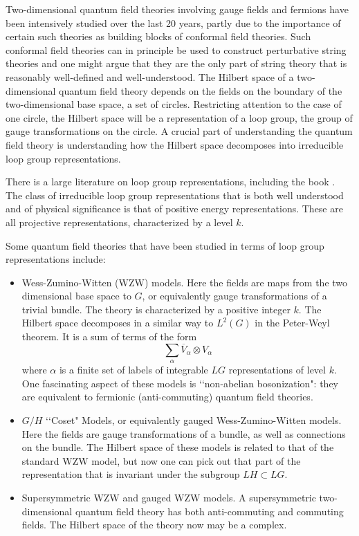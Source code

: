 \documentclass[a4paper,a4paper]{article}
\theoremstyle{conjecture}
\begin{document}
Two-dimensional quantum field theories involving gauge fields and fermions
 have been intensively studied over the last 20 years, partly due
to the importance of certain such theories as building blocks of conformal field theories.  Such
conformal field theories can in principle be used to construct perturbative string theories and one
might argue that they are the only part of string theory that is reasonably well-defined and
well-understood.  The Hilbert space of a two-dimensional quantum field theory depends on the
fields on the boundary of the two-dimensional base space, a set of circles.  Restricting
attention to the case of one circle, the Hilbert space will be a representation of a loop group, the
group of gauge transformations on the circle.  A crucial part of understanding the quantum field
theory is understanding how the Hilbert space decomposes into irreducible loop group representations.

There is a large literature on loop group representations, including the book \cite{PS}.  The class of irreducible loop group
representations that is both well understood and of physical significance is that of positive energy representations.  These are all
projective representations, characterized by a level $k$.

Some quantum field theories that have been studied in terms of loop group representations include:
\begin{itemize}
\item Wess-Zumino-Witten (WZW) models.  Here the fields are maps from the two dimensional base space to $G$, or equivalently gauge
transformations of a trivial bundle.  The theory is characterized by a positive integer $k$.  The Hilbert space decomposes in a similar
way to $L^2(G)$ in the Peter-Weyl theorem. It is a sum of terms of
the form
$$ \sum_{\alpha}{\overline V_\alpha}\otimes {V_\alpha}$$
where $\alpha$ is a finite set of labels of integrable $LG$ representations of level $k$.  One fascinating aspect of these
models is \lq\lq non-abelian bosonization": they are equivalent to fermionic (anti-commuting)  quantum field theories.

\item $G/H$ \lq\lq Coset" Models, or equivalently gauged Wess-Zumino-Witten models.  Here the fields are gauge transformations
of a bundle, as well as connections on the bundle.  The Hilbert space of these models is related to that of the standard WZW
model, but now one can pick out that part of the representation that is invariant under the subgroup $LH\subset LG$.

\item Supersymmetric WZW and gauged WZW models.  A supersymmetric two-dimensional quantum field theory has both anti-commuting
and commuting fields.  The Hilbert space of the theory now may be a complex.

\end{itemize}
\end{document}
